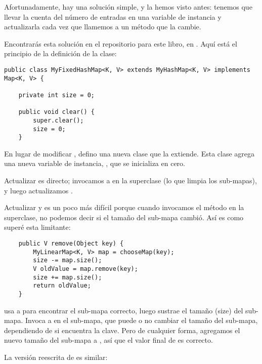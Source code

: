 \documentclass[12pt]{book}
\theoremstyle{exercise}
\begin{document}

Afortunadamente, hay una solución simple, y la hemos visto antes: tenemos
que llevar la cuenta del número de entradas en una variable de instancia y
actualizarla cada vez que llamemos a un método que la cambie.


Encontrarás esta solución en el repositorio para este libro, en
.  Aquí está el principio de la definición de la clase:

\begin{verbatim}
public class MyFixedHashMap<K, V> extends MyHashMap<K, V> implements Map<K, V> {

    private int size = 0;

    public void clear() {
        super.clear();
        size = 0;
    }
\end{verbatim}

En lugar de modificar , defino una nueva clase que
la extiende. Esta clase agrega una nueva variable de instancia, , 
que se inicializa en cero.

Actualizar  es directo; invocamos a  en
la superclase (lo que limpia los sub-mapas), y luego actualizamos
.


Actualizar  y  es un poco más difícil
porque cuando invocamos el método en la superclase, no podemos decir
si el tamaño del sub-mapa cambió. Así es como superé esta limitante:

\begin{verbatim}
    public V remove(Object key) {
        MyLinearMap<K, V> map = chooseMap(key);
        size -= map.size();
        V oldValue = map.remove(key);
        size += map.size();
        return oldValue;
    }
\end{verbatim}

 usa a  para encontrar el sub-mapa correcto, luego
sustrae el tamaño (size) del sub-mapa. Invoca a  en el
sub-mapa, que puede o no cambiar el tamaño del sub-mapa,
dependiendo de si encuentra la clave. Pero de cualquier forma, agregamos
el nuevo tamaño del sub-mapa a , así que el valor final de
 es correcto.


La versión reescrita de  es similar:
\end{document}
